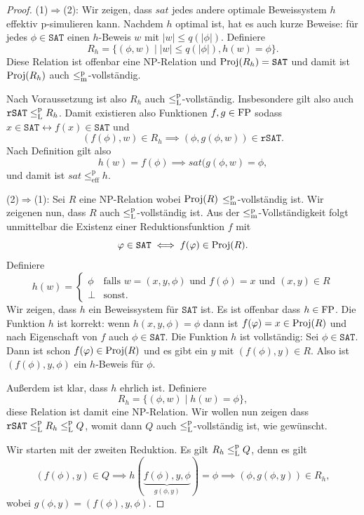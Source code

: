 \begin{proof}
    (1)$\Rightarrow$(2): 
    Wir zeigen, dass $\mathit{sat}$ jedes andere optimale Beweissystem $h$ effektiv p-simulieren kann.
    Nachdem $h$ optimal ist, hat es auch kurze Beweise: für jedes $\phi\in\mathtt{SAT}$ einen $h$-Beweis $w$ mit $|w|\leq q(|\phi|)$.  Definiere
    \[ R_h = \{ (\phi, w) \mid |w|\leq q(|\phi|), h(w) = \phi\}. \]
    Diese Relation ist offenbar eine NP-Relation und $\operatorname{Proj}(R_h) = \mathtt{SAT}$ und damit ist $\operatorname{Proj}(R_h)$ auch $\leq_\mathrm{m}^\mathrm{p}$-vollständig. 

    Nach Voraussetzung ist also  $R_h$ auch $\leq_\mathrm{L}^\mathrm{p}$-vollständig.
    Insbesondere gilt also  auch $\mathtt{rSAT} \leq_\mathrm{L}^\mathrm{p} R_h$. Damit existieren also Funktionen $f,g\in\mathrm{FP}$ sodass
    $x\in \mathtt{SAT} \leftrightarrow f(x)\in\mathtt{SAT}$ und
    \[ (f(\phi), w) \in R_h \implies (\phi, g(\phi, w))\in \mathtt{rSAT}. \]
    Nach Definition gilt also 
    \[ h(w)=f(\phi) \implies \mathit{sat}(g(\phi, w) = \phi, \]
    und damit ist $\mathit{sat} \leq^\mathrm p_\mathrm{eff} h$.
    \medskip

    (2)$\Rightarrow$(1): 
    Sei $R$ eine NP-Relation wobei $\operatorname{Proj}(R)$ $\leq_\mathrm{m}^\mathrm{p}$-vollständig ist. Wir zeigenen nun, dass $R$ auch $\leq_\mathrm{L}^\mathrm{p}$-vollständig ist.
    Aus der $\leq_\mathrm{m}^\mathrm{p}$-Vollständigkeit folgt unmittelbar die Existenz einer Reduktionsfunktion $f$ mit 
    \[ \varphi\in\mathtt{SAT} \iff f(\varphi) \in \operatorname{Proj}(R). \]
    Definiere
    \[ h(w) = \begin{cases} \phi & \text{falls $w=(x,y,\phi)$ und $f(\phi)=x$ und $(x,y)\in R$} \\ \bot & \text{sonst.} \end{cases} \]
    Wir zeigen, dass $h$ ein Beweissystem für $\mathtt{SAT}$ ist. Es ist offenbar dass $h\in\mathrm{FP}$. Die Funktion $h$ ist korrekt: wenn $h(x,y,\phi)=\phi$ dann ist $f(\varphi)=x\in\operatorname{Proj}(R)$ und nach Eigenschaft von $f$ auch $\phi\in\mathtt{SAT}$.
    Die Funktion $h$ ist vollständig: Sei $\phi\in\mathtt{SAT}$. Dann ist schon $f(\varphi)\in\operatorname{Proj}(R)$ und es gibt ein $y$ mit $(f(\phi),y)\in R$. Also ist $(f(\phi), y,\phi)$ ein $h$-Beweis für $\phi$.

    Außerdem ist klar, dass $h$ ehrlich ist.
    Definiere
    \[ R_h = \{ (\phi, w) \mid h(w) = \phi\}, \]
    diese Relation ist damit eine NP-Relation.
    Wir wollen nun zeigen dass $\mathtt{rSAT}\leq_\mathrm{L}^\mathrm{p} R_h \leq_\mathrm{L}^\mathrm{p} Q$, womit dann $Q$ auch $\leq_\mathrm{L}^\mathrm{p}$-vollständig ist, wie gewünscht.

    Wir starten mit der zweiten Reduktion.
    Es gilt $R_h \leq_\mathrm{L}^\mathrm{p} Q$, denn es gilt
    \[ (f(\phi), y)\in Q \implies h(\underbrace{f(\phi), y, \phi}_{g(\phi, y)})=\phi \implies (\phi, g(\phi, y))\in R_h, \]
    wobei $g(\phi, y)=(f(\phi), y, \phi)$.


\end{proof}
